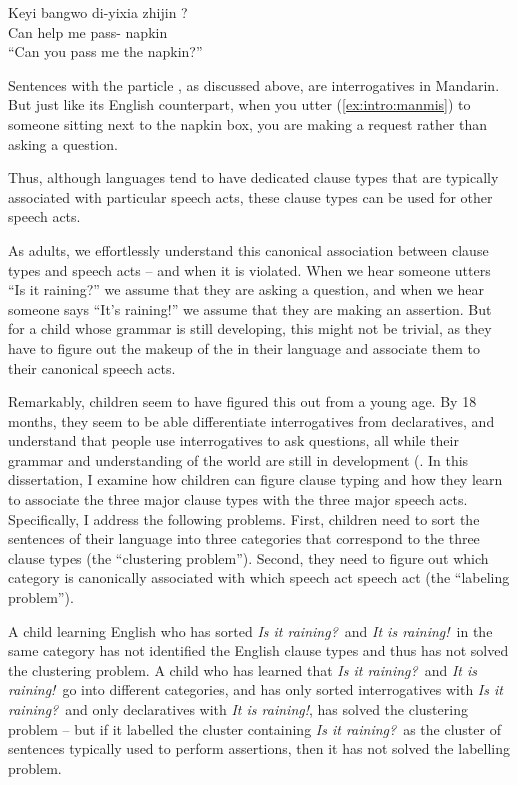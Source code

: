 \gll Keyi bangwo di-yixia zhijin ?\\
Can help me pass-\Clf{} napkin \Sfp{}\\
``Can you pass me the napkin?''
\eex

Sentences with the particle , as discussed above, are interrogatives in Mandarin. But just like its English counterpart, when you utter (\ref{ex:intro:manmis}) to someone sitting next to the napkin box, you are making a request rather than asking a question. 

Thus, although languages tend to have dedicated clause types that are typically associated with particular speech acts, these clause types can be used for other speech acts. 

As adults, we effortlessly understand this canonical association between clause types and speech acts -- and when it is violated. When we hear someone utters ``Is it raining?'' we assume that they are asking a question, and when we hear someone says ``It's raining!'' we assume that they are making an assertion.  But for a child whose grammar is still developing, this might not be trivial, as they have to figure out the makeup of the \diis{} in their language and associate them to their canonical speech acts.   %

Remarkably, children seem to have figured this out from a young age. By 18 months, they seem to be able differentiate interrogatives from declaratives, and understand that people use interrogatives to ask questions, all while their grammar and understanding of the world are still in development (\cite{geffenmintz2011,geffenmintz2015wordorder,casillas2017turn,perkins2019,marshmallowqueen}. In this dissertation, I examine how children can figure clause typing and how they learn to associate the three major clause types with the three major speech acts. Specifically, I address the following problems. First, children need to sort the sentences of their language into three categories that correspond to the three clause types (the ``clustering problem''). Second, they need to figure out which category is canonically associated with which speech act speech act (the ``labeling problem'').

A child learning English who has sorted \emph{Is it raining?}\ and \emph{It is raining!}\ in the same category has not identified the English clause types and thus has not solved the clustering problem. A child who has learned that \emph{Is it raining?}\ and \emph{It is raining!}\ go into different categories, and has only sorted interrogatives with \emph{Is it raining?}\ and only declaratives with \emph{It is raining!}, has solved the clustering problem -- but if it labelled the cluster containing \emph{Is it raining?}\ as the cluster of sentences typically used to perform assertions, then it has not solved the labelling problem. 

